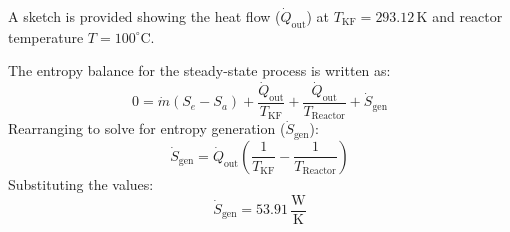 A sketch is provided showing the heat flow (\( \dot{Q}_{\text{out}} \)) at \( T_{\text{KF}} = 293.12 \, \text{K} \) and reactor temperature \( T = 100^\circ\text{C} \).  

The entropy balance for the steady-state process is written as:  
\[
0 = \dot{m} (S_e - S_a) + \frac{\dot{Q}_{\text{out}}}{T_{\text{KF}}} + \frac{\dot{Q}_{\text{out}}}{T_{\text{Reactor}}} + \dot{S}_{\text{gen}}
\]  
Rearranging to solve for entropy generation (\( \dot{S}_{\text{gen}} \)):  
\[
\dot{S}_{\text{gen}} = \dot{Q}_{\text{out}} \left( \frac{1}{T_{\text{KF}}} - \frac{1}{T_{\text{Reactor}}} \right)
\]  
Substituting the values:  
\[
\dot{S}_{\text{gen}} = 53.91 \, \frac{\text{W}}{\text{K}}
\]